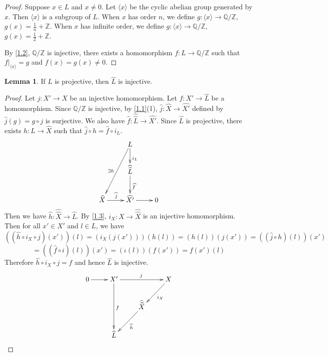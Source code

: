 \documentclass{amsart}
\numberwithin{equation}{section}
\theoremstyle{plain}
\theoremstyle{definition}
\newtheorem{lem}[equation]{Lemma}
\begin{document}
\begin{proof}
	Suppose $ x\in L $ and $ x\ne 0 $. 
	Let $ \langle x\rangle $ be the cyclic abelian group generated by $ x $. 
	Then $ \langle x\rangle $ is a subgroup of $ L $. 
	When $ x $ has order $ n $, we define $g:\langle x\rangle\to \mathbb Q/\mathbb Z  $, $ g(x)=\frac{1}{n}+\mathbb Z $. 
	When $ x $ has infinite order, we define $g:\langle x\rangle\to \mathbb Q/\mathbb Z  $, $ g(x)=\frac{1}{2}+\mathbb Z $. 
	
	By \cref{1.2}, $ \mathbb Q/\mathbb Z $ is injective, there exists a homomorphism $ f:L\to \mathbb Q/\mathbb Z $ such that $ f|_{\langle x\rangle}=g $ and $ f(x)=g(x)\ne 0 $. %
\end{proof}

\begin{lem}\label{1.4}
	If $ L $ is projective, then $ \widehat{L} $ is injective. 
\end{lem}

\begin{proof}
	Let $j: X'\to X $ be an injective homomorphism. 
	Let $ f: X'\to \widehat{L} $ be a homomorphism. 
	Since $ \mathbb Q/\mathbb Z $ is injective, by \cref{1.1}(1), $ \widehat{j}: \widehat{X}\to \widehat{X'} $ defined by $ \widehat{j}(g)=g\circ j $ is surjective. 
	We also have $ \widehat{f}:\widehat{\widehat{L}}\to \widehat{X'} $. 
	Since $ \widehat{L} $ is projective, there exists $ h: L\to \widehat{X} $ such that $ \widehat{j}\circ h =\widehat{f}\circ i_L$. 
	\[
	\xymatrix{
		& L\ar[d]^{i_L}\ar[ldd]_{\exists h} &\\
		& \widehat{\widehat{L}}\ar[d]^{\widehat{f}} &\\
		\widehat{X}\ar[r]^{\widehat{j}}&\widehat{X'}\ar[r]&0\\
		}
	\]
	Then we have $\widehat{h}:\widehat{\widehat{X}}\to \widehat{L} $. 
	By \cref{1.3}, $ i_X:X\to \widehat{\widehat{X}} $ is an injective homomorphism. 
	Then for all $ x'\in X' $ and $ l\in L $, we have 
	\[((\widehat{h}\circ i_X\circ j)(x'))(l)=(i_X(j(x')))(h(l))=(h(l))(j(x'))=((\widehat{j}\circ h)(l))(x')\]\[=((\widehat{f}\circ i)(l))(x')=(\iota(l))(f(x'))=f(x')(l)\]
	Therefore $ \widehat{h}\circ i_X\circ j=f $ and hence $ \widehat{L} $ is injective. 
	\[
	\xymatrix{
		0\ar[r]& X'\ar[rr]^{j}\ar[dd]^f&&X\ar[ld]^{i_X}\\
		&&\widehat{\widehat{X}}\ar[ld]^{\widehat{h}}&\\
		&\widehat{L}&\\
		}
	\]
\end{proof}
\end{document}
